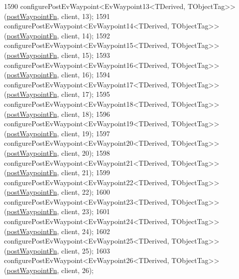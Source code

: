 \begin{DoxyCode}
1590     configurePostEvWaypoint<EvWaypoint13<TDerived, TObjectTag>>(\hyperlink{classmove__base__z__client_1_1WaypointEventDispatcher_acc538eb7506c13f7cca2268a1742dadd}{postWaypointFn}, client, 13);
1591     configurePostEvWaypoint<EvWaypoint14<TDerived, TObjectTag>>(\hyperlink{classmove__base__z__client_1_1WaypointEventDispatcher_acc538eb7506c13f7cca2268a1742dadd}{postWaypointFn}, client, 14);
1592     configurePostEvWaypoint<EvWaypoint15<TDerived, TObjectTag>>(\hyperlink{classmove__base__z__client_1_1WaypointEventDispatcher_acc538eb7506c13f7cca2268a1742dadd}{postWaypointFn}, client, 15);
1593     configurePostEvWaypoint<EvWaypoint16<TDerived, TObjectTag>>(\hyperlink{classmove__base__z__client_1_1WaypointEventDispatcher_acc538eb7506c13f7cca2268a1742dadd}{postWaypointFn}, client, 16);
1594     configurePostEvWaypoint<EvWaypoint17<TDerived, TObjectTag>>(\hyperlink{classmove__base__z__client_1_1WaypointEventDispatcher_acc538eb7506c13f7cca2268a1742dadd}{postWaypointFn}, client, 17);
1595     configurePostEvWaypoint<EvWaypoint18<TDerived, TObjectTag>>(\hyperlink{classmove__base__z__client_1_1WaypointEventDispatcher_acc538eb7506c13f7cca2268a1742dadd}{postWaypointFn}, client, 18);
1596     configurePostEvWaypoint<EvWaypoint19<TDerived, TObjectTag>>(\hyperlink{classmove__base__z__client_1_1WaypointEventDispatcher_acc538eb7506c13f7cca2268a1742dadd}{postWaypointFn}, client, 19);
1597     configurePostEvWaypoint<EvWaypoint20<TDerived, TObjectTag>>(\hyperlink{classmove__base__z__client_1_1WaypointEventDispatcher_acc538eb7506c13f7cca2268a1742dadd}{postWaypointFn}, client, 20);
1598     configurePostEvWaypoint<EvWaypoint21<TDerived, TObjectTag>>(\hyperlink{classmove__base__z__client_1_1WaypointEventDispatcher_acc538eb7506c13f7cca2268a1742dadd}{postWaypointFn}, client, 21);
1599     configurePostEvWaypoint<EvWaypoint22<TDerived, TObjectTag>>(\hyperlink{classmove__base__z__client_1_1WaypointEventDispatcher_acc538eb7506c13f7cca2268a1742dadd}{postWaypointFn}, client, 22);
1600     configurePostEvWaypoint<EvWaypoint23<TDerived, TObjectTag>>(\hyperlink{classmove__base__z__client_1_1WaypointEventDispatcher_acc538eb7506c13f7cca2268a1742dadd}{postWaypointFn}, client, 23);
1601     configurePostEvWaypoint<EvWaypoint24<TDerived, TObjectTag>>(\hyperlink{classmove__base__z__client_1_1WaypointEventDispatcher_acc538eb7506c13f7cca2268a1742dadd}{postWaypointFn}, client, 24);
1602     configurePostEvWaypoint<EvWaypoint25<TDerived, TObjectTag>>(\hyperlink{classmove__base__z__client_1_1WaypointEventDispatcher_acc538eb7506c13f7cca2268a1742dadd}{postWaypointFn}, client, 25);
1603     configurePostEvWaypoint<EvWaypoint26<TDerived, TObjectTag>>(\hyperlink{classmove__base__z__client_1_1WaypointEventDispatcher_acc538eb7506c13f7cca2268a1742dadd}{postWaypointFn}, client, 26);

\end{DoxyCode}
